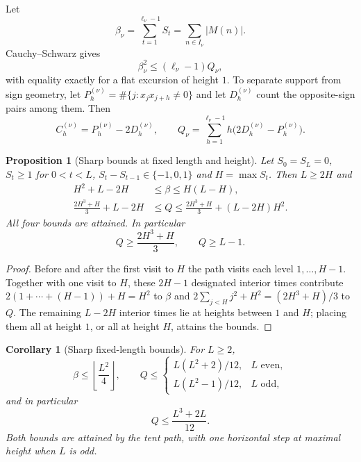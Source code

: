 \documentclass[11pt]{amsart}
\numberwithin{equation}{section}
\theoremstyle{plain}
\newtheorem{proposition}[theorem]{Proposition}
\newtheorem{corollary}[theorem]{Corollary}
\theoremstyle{definition}
\theoremstyle{remark}
\begin{document}
Let
\begin{equation}
\label{eq:beta_def}
\beta_\nu=\sum_{t=1}^{\ell_\nu-1}S_t=\sum_{n\in I_\nu}|M(n)|.
\end{equation}
Cauchy--Schwarz gives
\begin{equation}
\label{eq:beta-Q}
\beta_\nu^2\le(\ell_\nu-1)Q_\nu,
\end{equation}
with equality exactly for a flat excursion of height $1$. To separate
support from sign geometry, let $P_h^{(\nu)}=\#\{j:x_jx_{j+h}\ne0\}$ and let
$D_h^{(\nu)}$ count the opposite-sign pairs among them. Then
\begin{equation}
\label{eq:C-P-D}
C_h^{(\nu)}=P_h^{(\nu)}-2D_h^{(\nu)},\qquad
Q_\nu=\sum_{h=1}^{\ell_\nu-1}h\bigl(2D_h^{(\nu)}-P_h^{(\nu)}\bigr).
\end{equation}

\begin{proposition}[Sharp bounds at fixed length and height]
\label{prop:sharp-LH}
Let $S_0=S_L=0$, $S_t\ge1$ for $0<t<L$, $S_t-S_{t-1}\in\{-1,0,1\}$ and
$H=\max S_t$. Then $L\ge2H$ and
\begin{align}
H^2+L-2H&\le\beta\le H(L-H),\label{eq:beta-LH}\\
\frac{2H^3+H}{3}+L-2H&\le Q\le
\frac{2H^3+H}{3}+(L-2H)H^2.\label{eq:Q-LH}
\end{align}
All four bounds are attained. In particular
\begin{equation}
\label{eq:height_Q_min}
Q\ge\frac{2H^3+H}{3},\qquad Q\ge L-1.
\end{equation}
\end{proposition}

\begin{proof}
Before and after the first visit to $H$ the path visits each level
$1,\dots,H-1$. Together with one visit to $H$, these $2H-1$ designated
interior times contribute $2(1+\cdots+(H-1))+H=H^2$ to $\beta$ and
$2\sum_{j<H}j^2+H^2=(2H^3+H)/3$ to $Q$. The remaining $L-2H$ interior times
lie at heights between $1$ and $H$; placing them all at height $1$, or all
at height $H$, attains the bounds.
\end{proof}

\begin{corollary}[Sharp fixed-length bounds]
\label{cor:fixed-L}
For $L\ge2$,
\[
\beta\le\left\lfloor\frac{L^2}{4}\right\rfloor,\qquad
Q\le
\begin{cases}
L(L^2+2)/12,&L\text{ even},\\
L(L^2-1)/12,&L\text{ odd},
\end{cases}
\]
and in particular
\begin{equation}
\label{eq:Q_upper}
Q\le\frac{L^3+2L}{12}.
\end{equation}
Both bounds are attained by the tent path, with one horizontal step at
maximal height when $L$ is odd.
\end{corollary}
\end{document}
